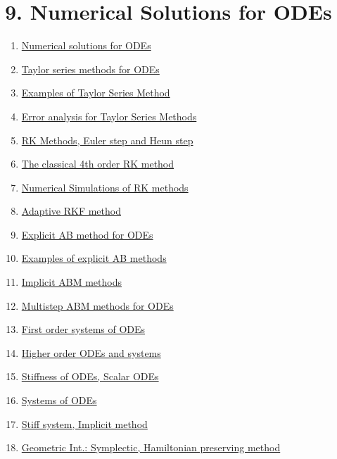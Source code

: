 \documentclass[11pt]{article}
\begin{document}
\vspace{-1cm}

\section*{9. Numerical Solutions for ODEs}

\vspace{-0.5cm}

\begin{multicols}{2}
	\begin{enumerate}
		\item \href{https://mp.weixin.qq.com/s/edOjNMh_l0dGaZ9ANC6qdA}{Numerical solutions for ODEs}	%
		\item \href{https://mp.weixin.qq.com/s/cyub8b9hvutn3mw2MdBUbQ}{Taylor series methods for ODEs}	%
		\item \href{https://mp.weixin.qq.com/s/hZjW_0rV5wAp7Iq0I9szXg}{Examples of Taylor Series Method}	%
		\item \href{https://mp.weixin.qq.com/s/ravom15hYpGNlA0PWoFcQQ}{Error analysis for Taylor Series Methods}	%
		\item \href{https://mp.weixin.qq.com/s/KR9Gm611HYpDnaBj0N2ldw}{RK Methods, Euler step and Heun step}	%
		\item \href{https://mp.weixin.qq.com/s/ta5WltWKFz8EFutuUZnliQ}{The classical 4th order RK method}	%
		\item \href{https://mp.weixin.qq.com/s/-X-J-piAF8J3xZJdeRMhZA}{Numerical Simulations of RK methods}	%
		\item \href{https://mp.weixin.qq.com/s/kZRaqvgMPdwmoUh1vyHE8Q}{Adaptive RKF method}	%
		\item \href{https://mp.weixin.qq.com/s/_55GlLIueMUn5VdZOc-I5g}{Explicit AB method for ODEs}	%
		\item \href{https://mp.weixin.qq.com/s/H9mNqIlLHbd2lbUAtMxgtA}{Examples of explicit AB methods}	%
		\item \href{https://mp.weixin.qq.com/s/OjdvaUB1qSAGPgN_gUYOIQ}{Implicit ABM methods}	%
		\item \href{https://mp.weixin.qq.com/s/GQFcWYDYtJcWdTlLwnHzAQ}{Multistep ABM methods for ODEs}	%
		\item \href{https://mp.weixin.qq.com/s/evKNoMBeTj-ffGBdfiIHqA}{First order systems of ODEs}	%
		\item \href{https://mp.weixin.qq.com/s/rAaky-w2djQD-LCkqbnnug}{Higher order ODEs and systems}	%
		\item \href{https://mp.weixin.qq.com/s/-TM3NlotxD3JP45Bpmt3Vg}{Stiffness of ODEs, Scalar ODEs}	%
		\item \href{https://mp.weixin.qq.com/s/yDlqxbww-g6jABb_QGKdQg}{Systems of ODEs}	%
		\item \href{https://mp.weixin.qq.com/s/BffTGTEjotU-zntWU3mAmQ}{Stiff system, Implicit method}	%
		\item \href{https://mp.weixin.qq.com/s/Q0wxbw4_49__3xyCyfCQTA}{Geometric Int.: Symplectic, Hamiltonian preserving method}	%
	\end{enumerate}
\end{multicols}
\end{document}
